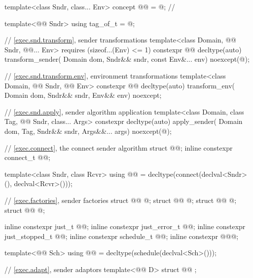 \begin{codeblock}
{  template<class Sndr, class... Env>
    concept @@ = @\seebelow@; // \expos

  template<@@ Sndr>
    using tag_of_t = @\seebelow@;

  // \ref{exec.snd.transform}, sender transformations
  template<class Domain, @@ Sndr, @@... Env>
      requires (sizeof...(Env) <= 1)
    constexpr @@ decltype(auto) transform_sender(
      Domain dom, Sndr&& sndr, const Env&... env) noexcept(@\seebelow@);

  // \ref{exec.snd.transform.env}, environment transformations
  template<class Domain, @@ Sndr, @@ Env>
    constexpr @@ decltype(auto) transform_env(
      Domain dom, Sndr&& sndr, Env&& env) noexcept;

  // \ref{exec.snd.apply}, sender algorithm application
  template<class Domain, class Tag, @@ Sndr, class... Args>
    constexpr decltype(auto) apply_sender(
      Domain dom, Tag, Sndr&& sndr, Args&&... args) noexcept(@\seebelow@);

  // \ref{exec.connect}, the connect sender algorithm
  struct @@;
  inline constexpr connect_t @@{};

  template<class Sndr, class Rcvr>
    using @@ =
      decltype(connect(declval<Sndr>(), declval<Rcvr>()));

  // \ref{exec.factories}, sender factories
  struct @@ { @\unspec@ };
  struct @@ { @\unspec@ };
  struct @@ { @\unspec@ };
  struct @@ { @\unspec@ };

  inline constexpr just_t @@{};
  inline constexpr just_error_t @@{};
  inline constexpr just_stopped_t @@{};
  inline constexpr schedule_t @@{};
  inline constexpr @\unspec@ @@{};

  template<@@ Sch>
    using @@ = decltype(schedule(declval<Sch>()));

  // \ref{exec.adapt}, sender adaptors
  template<@@ D>
    struct @@ { };

}
\end{codeblock}
